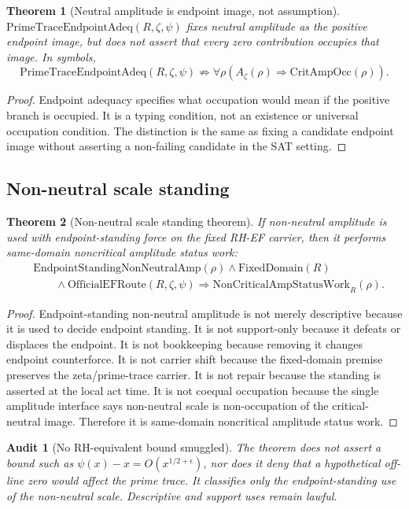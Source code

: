 \documentclass[11pt]{article}
\newtheorem{theorem}{Theorem}[section]
\newtheorem{audit}{Audit}[section]
\newcommand{\Az}{A_{\zeta}}
\newcommand{\FixedDomain}{\mathrm{FixedDomain}}
\newcommand{\OfficialEFRoute}{\mathrm{OfficialEFRoute}}
\newcommand{\CritAmpOcc}{\mathrm{CritAmpOcc}}
\newcommand{\NonCritAmpWork}{\mathrm{NonCriticalAmpStatusWork}}
\newcommand{\AmpStand}{\mathrm{EndpointStandingNonNeutralAmp}}
\newcommand{\PrimeTraceAdeq}{\mathrm{PrimeTraceEndpointAdeq}}
\begin{document}
\begin{theorem}[Neutral amplitude is endpoint image, not assumption]
\(\PrimeTraceAdeq(R,\zeta,\psi)\) fixes neutral amplitude as the positive endpoint image, but does not assert that every zero contribution occupies that image.  In symbols,
\[
\PrimeTraceAdeq(R,\zeta,\psi)\not\Rightarrow \forall \rho(\Az(\rho)\Rightarrow \CritAmpOcc(\rho)).
\]
\end{theorem}

\begin{proof}
Endpoint adequacy specifies what occupation would mean if the positive branch is occupied.  It is a typing condition, not an existence or universal occupation condition.  The distinction is the same as fixing a candidate endpoint image without asserting a non-failing candidate in the SAT setting.
\end{proof}

\subsection{Non-neutral scale standing}

\begin{theorem}[Non-neutral scale standing theorem]
If non-neutral amplitude is used with endpoint-standing force on the fixed RH-EF carrier, then it performs same-domain noncritical amplitude status work:
\[
\begin{aligned}
&\AmpStand(\rho)\wedge \FixedDomain(R)\\
&\qquad\wedge \OfficialEFRoute(R,\zeta,\psi)
\Rightarrow \NonCritAmpWork_R(\rho).
\end{aligned}
\]
\end{theorem}

\begin{proof}
Endpoint-standing non-neutral amplitude is not merely descriptive because it is used to decide endpoint standing.  It is not support-only because it defeats or displaces the endpoint.  It is not bookkeeping because removing it changes endpoint counterforce.  It is not carrier shift because the fixed-domain premise preserves the zeta/prime-trace carrier.  It is not repair because the standing is asserted at the local act time.  It is not coequal occupation because the single amplitude interface says non-neutral scale is non-occupation of the critical-neutral image.  Therefore it is same-domain noncritical amplitude status work.
\end{proof}

\begin{audit}[No RH-equivalent bound smuggled]
The theorem does not assert a bound such as \(\psi(x)-x=O(x^{1/2+\epsilon})\), nor does it deny that a hypothetical off-line zero would affect the prime trace.  It classifies only the endpoint-standing use of the non-neutral scale.  Descriptive and support uses remain lawful.
\end{audit}
\end{document}
